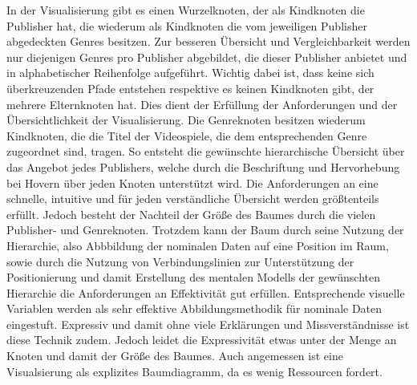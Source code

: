 \documentclass[usegeometry=true]{scrartcl}
\begin{document}
In der Visualisierung gibt es einen Wurzelknoten, der als Kindknoten die Publisher hat, die wiederum als Kindknoten die vom jeweiligen Publisher abgedeckten Genres besitzen. 
Zur besseren Übersicht und Vergleichbarkeit werden nur diejenigen Genres pro Publisher abgebildet, die dieser Publisher anbietet und in alphabetischer Reihenfolge aufgeführt. 
Wichtig dabei ist, dass keine sich überkreuzenden Pfade entstehen respektive es keinen Kindknoten gibt, der mehrere Elternknoten hat. 
Dies dient der Erfüllung der Anforderungen und der Übersichtlichkeit der Visualisierung.
Die Genreknoten besitzen wiederum Kindknoten, die die Titel der Videospiele, die dem entsprechenden Genre zugeordnet sind, tragen. 
So entsteht die gewünschte hierarchische Übersicht über das Angebot jedes Publishers, welche durch die Beschriftung und Hervorhebung bei Hovern über jeden Knoten unterstützt wird.
Die Anforderungen an eine schnelle, intuitive und für jeden verständliche Übersicht werden größtenteils erfüllt. 
Jedoch besteht der Nachteil der Größe des Baumes durch die vielen Publisher- und Genreknoten. 
Trotzdem kann der Baum durch seine Nutzung der Hierarchie, also Abbbildung der nominalen Daten auf eine Position im Raum, sowie durch die Nutzung von Verbindungslinien zur Unterstützung der Positionierung und damit Erstellung des mentalen Modells der gewünschten Hierarchie die Anforderungen an Effektivität gut erfüllen.
Entsprechende visuelle Variablen werden als sehr effektive Abbildungsmethodik für nominale Daten eingestuft. 
Expressiv und damit ohne viele Erklärungen und Missverständnisse ist diese Technik zudem.
Jedoch leidet die Expressivität etwas unter der Menge an Knoten und damit der Größe des Baumes.
Auch angemessen ist eine Visualsierung als explizites Baumdiagramm, da es wenig Ressourcen fordert. 
\end{document}

